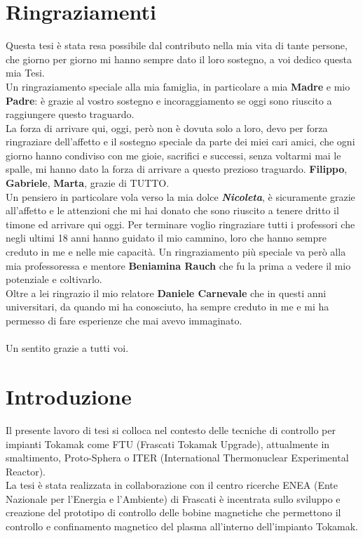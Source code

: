 \chapter*{Ringraziamenti} 
Questa tesi è stata resa possibile dal contributo nella mia vita di tante persone, che giorno per giorno mi hanno sempre dato il loro sostegno, a voi dedico questa mia Tesi.\\
Un ringraziamento speciale alla mia famiglia, in particolare a mia \textbf{Madre} e mio \textbf{Padre}: è grazie al vostro sostegno e incoraggiamento se oggi sono riuscito a raggiungere questo traguardo.\\
La forza di arrivare qui, oggi, però non è dovuta solo a loro, devo per forza ringraziare dell'affetto e il sostegno speciale da parte dei miei cari amici, che ogni giorno hanno condiviso con me gioie, sacrifici e successi, senza voltarmi mai le spalle, mi hanno dato la forza di arrivare a questo prezioso traguardo.
\textbf{Filippo}, \textbf{Gabriele}, \textbf{Marta}, grazie di TUTTO.\\
Un pensiero in particolare vola verso la mia dolce \textbf{\textit{Nicoleta}}, è sicuramente grazie all'affetto e le attenzioni che mi hai donato che sono riuscito a tenere dritto il timone ed arrivare qui oggi.
Per terminare voglio ringraziare tutti i professori che negli ultimi 18 anni hanno guidato il mio cammino, loro che hanno sempre creduto in me e nelle mie capacità. Un ringraziamento più speciale va però alla mia professoressa e mentore \textbf{Beniamina Rauch} che fu la prima a vedere il mio potenziale e coltivarlo.\\
Oltre a lei ringrazio il mio relatore \textbf{Daniele Carnevale} che in questi anni universitari, da quando mi ha conosciuto, ha sempre creduto in me e mi ha permesso di fare esperienze che mai avevo immaginato.\\ \\
Un sentito grazie a tutti voi.\\
%
\chapter*{Introduzione}
Il presente lavoro di tesi si colloca nel contesto delle tecniche di controllo per impianti Tokamak come
FTU (Frascati Tokamak Upgrade), attualmente in smaltimento, Proto-Sphera o ITER (International Thermonuclear Experimental Reactor).\\
La tesi è stata realizzata in collaborazione con il centro ricerche ENEA (Ente Nazionale per l’Energia e l’Ambiente) di Frascati è incentrata sullo sviluppo e creazione del prototipo di controllo delle bobine magnetiche che permettono il controllo e confinamento magnetico del plasma all'interno dell'impianto Tokamak.

